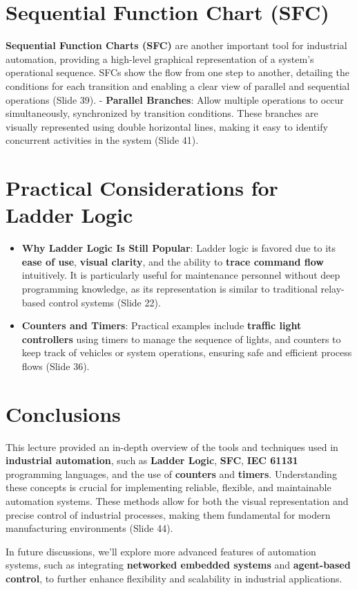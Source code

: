 \documentclass[
  14pt,
  a4paper,
  numbers=noendperiod,
  headinclude=true,
  footinclude=true,
  DIV=calc]{scrreprt}
\providecommand{\tightlist}{%
  \setlength{\itemsep}{0pt}\setlength{\parskip}{0pt}}\usepackage{longtable,booktabs,array}
\begin{document}
\section{Sequential Function Chart
(SFC)}\label{sequential-function-chart-sfc}

\textbf{Sequential Function Charts (SFC)} are another important tool for
industrial automation, providing a high-level graphical representation
of a system's operational sequence. SFCs show the flow from one step to
another, detailing the conditions for each transition and enabling a
clear view of parallel and sequential operations (Slide 39). -
\textbf{Parallel Branches}: Allow multiple operations to occur
simultaneously, synchronized by transition conditions. These branches
are visually represented using double horizontal lines, making it easy
to identify concurrent activities in the system (Slide 41).

\section{Practical Considerations for Ladder
Logic}\label{practical-considerations-for-ladder-logic}

\begin{itemize}
\tightlist
\item
  \textbf{Why Ladder Logic Is Still Popular}: Ladder logic is favored
  due to its \textbf{ease of use}, \textbf{visual clarity}, and the
  ability to \textbf{trace command flow} intuitively. It is particularly
  useful for maintenance personnel without deep programming knowledge,
  as its representation is similar to traditional relay-based control
  systems (Slide 22).
\item
  \textbf{Counters and Timers}: Practical examples include
  \textbf{traffic light controllers} using timers to manage the sequence
  of lights, and counters to keep track of vehicles or system
  operations, ensuring safe and efficient process flows (Slide 36).
\end{itemize}

\section{Conclusions}\label{conclusions}

This lecture provided an in-depth overview of the tools and techniques
used in \textbf{industrial automation}, such as \textbf{Ladder Logic},
\textbf{SFC}, \textbf{IEC 61131} programming languages, and the use of
\textbf{counters} and \textbf{timers}. Understanding these concepts is
crucial for implementing reliable, flexible, and maintainable automation
systems. These methods allow for both the visual representation and
precise control of industrial processes, making them fundamental for
modern manufacturing environments (Slide 44).

In future discussions, we'll explore more advanced features of
automation systems, such as integrating \textbf{networked embedded
systems} and \textbf{agent-based control}, to further enhance
flexibility and scalability in industrial applications.
\end{document}
